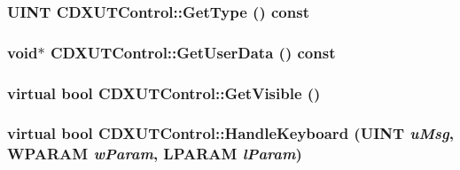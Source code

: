 \label{class_c_d_x_u_t_control_ad8c4cecdf845ce2d533b382747ed4a02}
\hypertarget{class_c_d_x_u_t_control_aa251f3cc545d44bf6296b1ca1e0b8c42}{
\subsubsection[{GetType}]{\setlength{\rightskip}{0pt plus 5cm}UINT CDXUTControl::GetType () const}}
\label{class_c_d_x_u_t_control_aa251f3cc545d44bf6296b1ca1e0b8c42}
\hypertarget{class_c_d_x_u_t_control_ae0d69e33c788ebb827c02886b1ab8ff9}{
\subsubsection[{GetUserData}]{\setlength{\rightskip}{0pt plus 5cm}void$\ast$ CDXUTControl::GetUserData () const}}
\label{class_c_d_x_u_t_control_ae0d69e33c788ebb827c02886b1ab8ff9}
\hypertarget{class_c_d_x_u_t_control_a054da7df1c749c7462d2d2d3a391a638}{
\subsubsection[{GetVisible}]{\setlength{\rightskip}{0pt plus 5cm}virtual bool CDXUTControl::GetVisible ()}}
\label{class_c_d_x_u_t_control_a054da7df1c749c7462d2d2d3a391a638}
\hypertarget{class_c_d_x_u_t_control_a94044e608adeac7c329d83cf63587dcf}{
\subsubsection[{HandleKeyboard}]{\setlength{\rightskip}{0pt plus 5cm}virtual bool CDXUTControl::HandleKeyboard (UINT {\em uMsg}, \/  WPARAM {\em wParam}, \/  LPARAM {\em lParam})}}
\label{class_c_d_x_u_t_control_a94044e608adeac7c329d83cf63587dcf}


